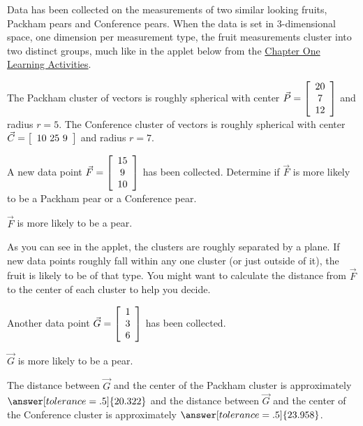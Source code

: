 \documentclass{ximera}
\author{Zack Reed}
\begin{document}
\begin{exercise}

  Data has been collected on the measurements of two similar looking fruits, Packham pears and Conference pears. When the data is set in 3-dimensional space, one dimension per measurement type, the fruit measurements cluster into two distinct groups, much like in the applet below from the \href{https://ximera.osu.edu/appliedlinearalgebra/c1ChapterOne/learningActivities/m1LearningActivities/m1s1Vectors/vectorsAreEverywhereOne}{Chapter One Learning Activities}.

  \begin{center}
  \end{center}

  The Packham cluster of vectors is roughly spherical with center $\vec{P} = \startmat{c} 20 \\ 7 \\ 12 \stopmat$ and radius $r = 5$. The Conference cluster of vectors is roughly spherical with center $\vec{C} = \startmat{c} 10 \ 25 \ 9 \stopmat$ and radius $r = 7$.

  A new data point $\vec{F} = \startmat{c} 15 \\ 9 \\ 10 \stopmat$ has been collected. Determine if $\vec{F}$ is more likely to be a Packham pear or a Conference pear.
  
  $\vec{F}$ is more likely to be a 
     pear. 
  
  \begin{hint}
  
  As you can see in the applet, the clusters are roughly separated by a plane. If new data points roughly fall within any one cluster (or just outside of it), the fruit is likely to be of that type. You might want to calculate the distance from $\vec{F}$ to the center of each cluster to help you decide.
  
  \end{hint}
  
  Another data point $\vec{G} = \startmat{c} 1 \\ 3 \\ 6 \stopmat$ has been collected.
  
  $\vec{G}$ is more likely to be a 
    pear.
  
  The distance between $\vec{G}$ and the center of the Packham cluster is approximately $\answer[tolerance=.5]{20.322}$ and the distance between $\vec{G}$ and the center of the Conference cluster is approximately $\answer[tolerance=.5]{23.958}$.

\end{exercise}
\end{document}

